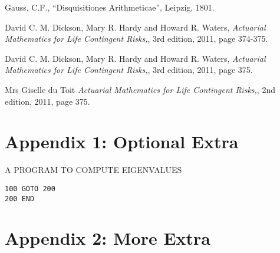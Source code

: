 \documentclass{report}
\begin{document}
\begin{thebibliography}{99}             %

 Gauss, C.F.,
    ``Disquisitiones Arithmeticae'', Leipzig, 1801.

  David C. M. Dickson, Mary R. Hardy and Howard R. Waters,
    {\em Actuarial Mathematics for Life Contingent Risks,},
    3rd edition, 2011, 
    page 374-375.

  David C. M. Dickson, Mary R. Hardy and Howard R. Waters,
    {\em Actuarial Mathematics for Life Contingent Risks,},
    3rd edition, 2011, 
    page 375.



  Mrs Giselle du Toit
    {\em Actuarial Mathematics for Life Contingent Risks,},
    2nd edition, 2011, 
    page 375.




\end{thebibliography}


\chapter*{Appendix 1: Optional Extra}

\begin{center}
   {\Large A PROGRAM TO COMPUTE EIGENVALUES}
\end{center}

\begin{verbatim}    
100 GOTO 200
200 END
\end{verbatim}    

\chapter*{Appendix 2: More Extra}


%
%
\newcommand{\X}[1]{$#1$&\texttt{\string#1}\hspace*{1ex}}
\newsavebox{\symbbox}
\newenvironment{symbols}[1]%
{\par\vspace*{2ex}
\begin{lrbox}{\symbbox}
\hspace*{4ex}\begin{tabular}{@{}#1@{}}}%
{\end{tabular}\end{lrbox}\makebox[\textwidth]{\usebox{\symbbox}}\par\medskip}
\end{document}
